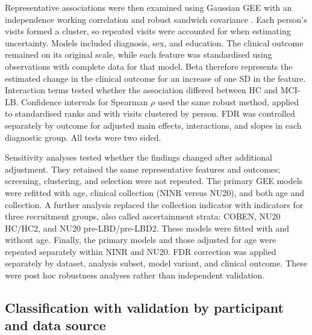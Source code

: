 \documentclass[referee,pdflatex,sn-vancouver-num]{sn-jnl}
\begin{document}
Representative associations were then examined using Gaussian GEE with an
independence working correlation and robust sandwich covariance
\cite{liang1986gee}. Each person's visits formed a cluster, so repeated visits
were accounted for when estimating uncertainty. Models included diagnosis,
sex, and education. The clinical outcome remained on its original scale, while
each feature was standardised using observations with complete data for that
model. Beta therefore represents the estimated change in the clinical outcome
for an increase of one SD in the feature. Interaction terms tested whether
the association differed between HC and MCI-LB. Confidence intervals for
Spearman $\rho$ used the same robust method, applied to standardised ranks and
with visits clustered by person. FDR
was controlled separately by outcome for adjusted main effects, interactions,
and slopes in each diagnostic group. All tests were two sided.

Sensitivity analyses tested whether the findings changed after additional
adjustment. They retained the same representative features and outcomes;
screening, clustering, and selection were not repeated. The primary GEE models were
refitted with age, clinical collection (NINR versus NU20), and both age and
collection. A further analysis replaced the collection indicator with indicators
for three recruitment groups, also called ascertainment strata: COBEN,
NU20 HC/HC2, and NU20 pre-LBD/pre-LBD2. These models were fitted with and
without age. Finally, the primary models and those adjusted for age
were repeated separately within NINR and NU20. FDR correction was
applied separately by dataset, analysis subset, model variant, and clinical
outcome. These were post hoc robustness analyses rather than independent
validation.

\subsection{Classification with validation by participant and data source}\label{subsec:classification}
\end{document}
